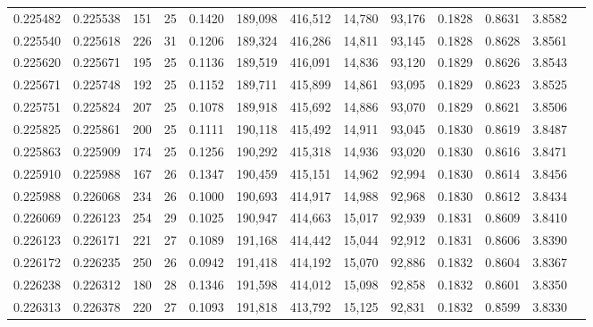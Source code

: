 \begin{tabular}{rrrrrrrrrrrrr}
0.225482 & 0.225538 &   151 &  25 &                                     0.1420 & 189,098 & 416,512 &  14,780 &  93,176 & 0.1828 & 0.8631 & 3.8582 \\
0.225540 & 0.225618 &   226 &  31 &                                     0.1206 & 189,324 & 416,286 &  14,811 &  93,145 & 0.1828 & 0.8628 & 3.8561 \\
0.225620 & 0.225671 &   195 &  25 &                                     0.1136 & 189,519 & 416,091 &  14,836 &  93,120 & 0.1829 & 0.8626 & 3.8543 \\
0.225671 & 0.225748 &   192 &  25 &                                     0.1152 & 189,711 & 415,899 &  14,861 &  93,095 & 0.1829 & 0.8623 & 3.8525 \\
0.225751 & 0.225824 &   207 &  25 &                                     0.1078 & 189,918 & 415,692 &  14,886 &  93,070 & 0.1829 & 0.8621 & 3.8506 \\
0.225825 & 0.225861 &   200 &  25 &                                     0.1111 & 190,118 & 415,492 &  14,911 &  93,045 & 0.1830 & 0.8619 & 3.8487 \\
0.225863 & 0.225909 &   174 &  25 &                                     0.1256 & 190,292 & 415,318 &  14,936 &  93,020 & 0.1830 & 0.8616 & 3.8471 \\
0.225910 & 0.225988 &   167 &  26 &                                     0.1347 & 190,459 & 415,151 &  14,962 &  92,994 & 0.1830 & 0.8614 & 3.8456 \\
0.225988 & 0.226068 &   234 &  26 &                                     0.1000 & 190,693 & 414,917 &  14,988 &  92,968 & 0.1830 & 0.8612 & 3.8434 \\
0.226069 & 0.226123 &   254 &  29 &                                     0.1025 & 190,947 & 414,663 &  15,017 &  92,939 & 0.1831 & 0.8609 & 3.8410 \\
0.226123 & 0.226171 &   221 &  27 &                                     0.1089 & 191,168 & 414,442 &  15,044 &  92,912 & 0.1831 & 0.8606 & 3.8390 \\
0.226172 & 0.226235 &   250 &  26 &                                     0.0942 & 191,418 & 414,192 &  15,070 &  92,886 & 0.1832 & 0.8604 & 3.8367 \\
0.226238 & 0.226312 &   180 &  28 &                                     0.1346 & 191,598 & 414,012 &  15,098 &  92,858 & 0.1832 & 0.8601 & 3.8350 \\
0.226313 & 0.226378 &   220 &  27 &                                     0.1093 & 191,818 & 413,792 &  15,125 &  92,831 & 0.1832 & 0.8599 & 3.8330 \\

\end{tabular}

